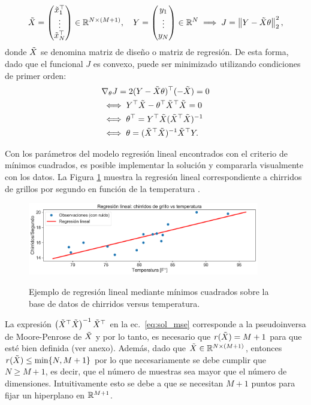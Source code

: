 \begin{equation}
  \tilde{X} = \left( \begin{matrix}\tilde{x}_1^\top \\\vdots \\ \tilde{x}_N^\top \end{matrix}\right)\in\mathbb{R}^{N\times (M+1)} ,\quad
  Y = \left( \begin{matrix}y_1 \\\vdots \\y_N \end{matrix}\right) \in\mathbb{R}^{N} \implies J = \left\lVert Y-\tilde{X}\theta\right\rVert_2^2,
 \label{eq:matrices_X} 
\end{equation}
donde $\tilde{X}$ se denomina matriz de diseño o matriz de regresión. De esta forma, dado que el funcional $J$ es convexo, puede ser minimizado utilizando condiciones de primer orden:
\begin{align}
	&\nabla_\theta J= 2(Y-\tilde{X}\theta)^\top(-\tilde{X})=0\nonumber \\
	& \iff Y^\top\tilde{X} -\theta^\top\tilde{X}^\top\tilde{X} = 0\nonumber\\
	& \iff \theta^\top = Y^\top \tilde{X}(\tilde{X}^\top\tilde{X})^{-1}\nonumber\\
	& \iff \theta = (\tilde{X}^\top\tilde{X})^{-1}\tilde{X}^\top Y. \label{eq:sol_mse}
\end{align}

Con los parámetros del modelo regresión lineal encontrados con el criterio de mínimos cuadrados, es posible implementar la solución y compararla visualmente con los datos. La Figura \ref{fig:reg_lin_1} muestra la regresión lineal correspondiente a chirridos de grillos por segundo en función de la temperatura \cite{insects}. 

\begin{figure}[H]
	\centering
	\includegraphics[width=0.9\textwidth]{img/cap2_chirridos.pdf}\\
	\caption{Ejemplo de regresión lineal mediante mínimos cuadrados sobre la base de datos de chirridos versus temperatura.}
	\label{fig:reg_lin_1}
\end{figure}

La expresión $\left(\tilde{X}^\top\tilde{X} \right)^{-1} \tilde{X}^\top$ en la ec.~\eqref{eq:sol_mse} corresponde a la pseudoinversa de Moore-Penrose de $\tilde{X}$ \cite[p.~7]{benisrael_greville_2006} y por lo tanto, es necesario que $r(\tilde{X})=M+1$  para que esté bien definida (ver anexo). Además, dado que $\tilde{X}\in\mathbb{R}^{N\times (M+1)}$, entonces $r(\tilde{X})\leq\min\{N,M+1\}$ por lo que necesariamente se debe cumplir que $N\geq M+1$, es decir, que el número de muestras sea mayor que el número de dimensiones. Intuitivamente esto se debe a que se necesitan $M+1$ puntos para fijar un hiperplano en $\mathbb{R}^{M+1}$.\\

